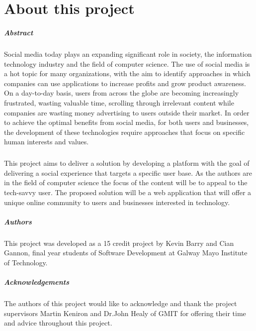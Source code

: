 
\chapter*{About this project}
\paragraph{Abstract}
Social media today plays an expanding significant role in society, the information technology industry and the field of computer science. The use of social media is a hot topic for many organizations, with the aim to identify approaches in which companies can use applications to increase profits and grow product awareness. On a day-to-day basis, users from across the globe are becoming increasingly frustrated, wasting valuable time, scrolling through irrelevant content while companies are wasting money advertising to users outside their market.  In order to achieve the optimal benefits from social media, for both users and businesses, the development of these technologies require approaches that focus on specific human interests and values.

\paragraph{}
This project aims to deliver a solution by developing a platform with the goal of delivering a social experience that targets a specific user base. As the authors are in the field of computer science the focus of the content will be to appeal to the tech-savvy user. The proposed solution will be a web application that will offer a unique online community to users and businesses interested in technology. 

\paragraph{Authors}
This project was developed as a 15 credit project by Kevin Barry and Cian Gannon, final year students of Software Development at Galway Mayo Institute of Technology.

\paragraph{Acknowledgements}
The authors of this project would like to acknowledge and thank the project supervisors Martin Keniron and Dr.John Healy of GMIT for offering their time and advice throughout this project.








